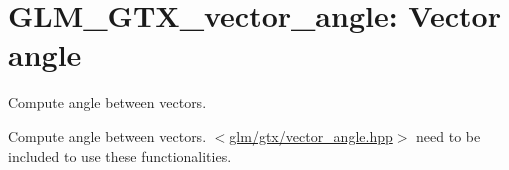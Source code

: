 \hypertarget{group__gtx__vector__angle}{\section{\-G\-L\-M\-\_\-\-G\-T\-X\-\_\-vector\-\_\-angle\-: \-Vector angle}
\label{group__gtx__vector__angle}
}


\-Compute angle between vectors.  


\-Compute angle between vectors. $<$\hyperlink{vector__angle_8hpp}{glm/gtx/vector\-\_\-angle.\-hpp}$>$ need to be included to use these functionalities. 